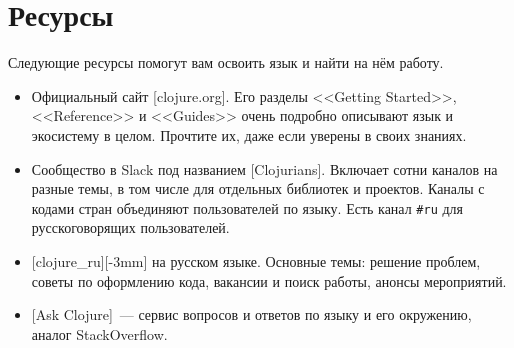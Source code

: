 \section*{Ресурсы}

Следующие ресурсы помогут вам освоить язык и найти на нём работу.

\begin{itemize}

\item
  Официальный сайт [clojure.org].
  Его разделы <<Getting Started>>, <<Reference>> и <<Guides>> очень подробно
  описывают язык и экосистему в целом. Прочтите их, даже если уверены в своих знаниях.

\item
  Сообщество в Slack под названием
  [Clo\-ju\-ri\-ans].
  Включает сотни каналов на разные темы, в том числе для отдельных библиотек и
  проектов. Каналы с кодами стран объединяют пользователей по языку. Есть канал
  \verb|#ru| для русскоговорящих пользователей.

\item
  [cloju\-re\_ru][-3mm]
  на русском языке. Основные темы: решение проблем, советы по
  оформлению кода, вакансии и поиск работы, анонсы мероприятий.

\item
  [Ask Clojure]~---
  сервис вопросов и ответов по языку и его окружению, аналог
  StackOverflow.

\end{itemize}

